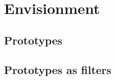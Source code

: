 \section{Envisionment} \label{sec:envisionment}

\subsection{Prototypes}




\subsection{Prototypes as filters}
\cite{lim}

